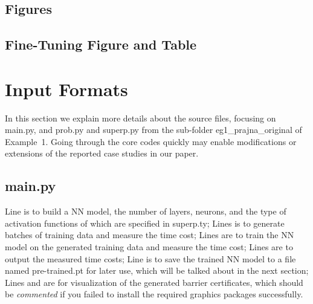 \documentclass{llncs}
\begin{document}
\subsection{Figures}

\subsection{Fine-Tuning Figure and Table}


\section{Input Formats}

In this section we explain more details about the source files, focusing on \textsf{main.py}, and \textsf{prob.py} and \textsf{superp.py} from the sub-folder
{\color{blue}\textsf{eg1\_prajna\_original}} of Example~1. Going through the core codes quickly may enable modifications or extensions of
the reported case studies in our paper.

\subsection{\textsf{main.py}}
Line 
is to build a NN model, the number of layers, neurons, and the type of activation functions of which are specified in \textsf{superp.ty};
Lines
is to generate batches of training data and measure the time cost; 
Lines
are to train the NN model on the generated training data and measure the time cost;
Lines
are to output the measured time costs; 
Line
is to save the trained NN model to a file named \textsf{pre-trained.pt} for later use, which will be talked about in the next section;
Lines
and
are for visualization of the generated barrier certificates, which should be \emph{commented} if you
failed to install the required graphics packages successfully.
\end{document}

